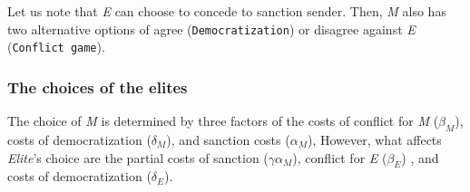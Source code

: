 \documentclass[11pt]{article}
\begin{document}
Let us note that \textit{E} can choose to concede to sanction sender. Then, \textit{M} also has two alternative options of agree (\texttt{Democratization}) or disagree against \textit{E} (\texttt{Conflict game}).
	
\subsubsection*{The choices of the elites}

The choice of \textit{M} is determined by three factors of the costs of conflict for \textit{M} ($\beta_{M}$), costs of democratization ($\delta_{M}$), and sanction costs ($\alpha_{M}$), However, what affects \textit{Elite}'s choice are the partial costs of sanction ($\gamma\alpha_{M}$), conflict for \textit{E} ($\beta_{E}$)
, and costs of democratization ($\delta_{E}$).
\end{document}
